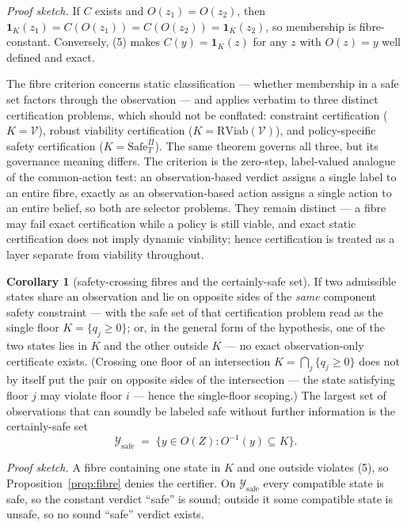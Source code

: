 \documentclass[10pt,twocolumn]{article}
\theoremstyle{definition}
\newtheorem{corollary}{Corollary}
\begin{document}
\emph{Proof sketch.} If \(C\) exists and \(O(z_1) = O(z_2)\), then \(\mathbf{1}_K(z_1) = C(O(z_1)) = C(O(z_2)) = \mathbf{1}_K(z_2)\), so membership is fibre-constant. Conversely, (5) makes \(C(y) = \mathbf{1}_K(z)\) for any \(z\) with \(O(z) = y\) well defined and exact.

The fibre criterion concerns static classification --- whether
membership in a safe set factors through the observation --- and applies
verbatim to three distinct certification problems, which should not be
conflated: constraint certification (\(K = \mathcal{V}\)), robust
viability certification (\(K = \mathrm{RViab}(\mathcal{V})\)), and
policy-specific safety certification (\(K = \mathrm{Safe}^{\Pi}_T\)).
The same theorem governs all three, but its governance meaning differs.
The criterion is the zero-step, label-valued analogue of the
common-action test: an observation-based verdict assigns a single label
to an entire fibre, exactly as an observation-based action assigns a
single action to an entire belief, so both are selector problems. They
remain distinct --- a fibre may fail exact certification while a policy
is still viable, and exact static certification does not imply dynamic
viability; hence certification is treated as a layer separate from
viability throughout.

\begin{corollary}[safety-crossing fibres and the certainly-safe set]\label{cor:certainly-safe} If two admissible states share an observation and lie on opposite
sides of the \emph{same} component safety constraint --- with the safe
set of that certification problem read as the single floor
\(K = \{ q_j \ge 0 \}\); or, in the general form of the hypothesis, one
of the two states lies in \(K\) and the other outside \(K\) --- no exact
observation-only certificate exists. (Crossing one floor of an
intersection \(K = \bigcap_j \{ q_j \ge 0 \}\) does not by itself put
the pair on opposite sides of the intersection --- the state satisfying
floor \(j\) may violate floor \(i\) --- hence the single-floor scoping.)
The largest set of observations that can soundly be labeled safe without
further information is the certainly-safe set
\[\mathcal{Y}_{\mathrm{safe}} \;=\; \big\{ y \in O(Z) : O^{-1}(y) \subseteq K \big\}.\]

\end{corollary}

\emph{Proof sketch.} A fibre containing one state in \(K\) and one outside violates (5), so Proposition~\ref{prop:fibre} denies the certifier. On \(\mathcal{Y}_{\mathrm{safe}}\) every compatible state is safe, so the constant verdict ``safe'' is sound; outside it some compatible state is unsafe, so no sound ``safe'' verdict exists.
\end{document}
